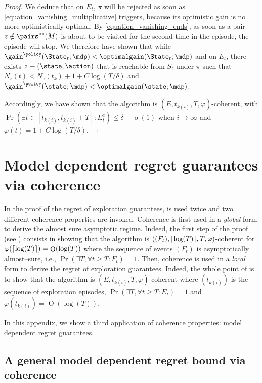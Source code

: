\documentclass[preprint,cleveref,12pt]{colt2025}
\DeclarePairedDelimiter{\ceil}{\lceil}{\rceil}	%
\DeclareMathOperator*{\oh}{\mathrm{o}}
\DeclareMathOperator*{\OH}{\mathrm{O}}
\def\model{\mdp}
\def\optgain{\optimalgain} %
\begin{document}
\begin{proof}
        We deduce that on $E_t$, $\pi$ will be rejected as soon as \eqref{equation_vanishing_multiplicative} triggers, because its optimistic gain is no more optimistically optimal.
        By \eqref{equation_vanishing_ends}, as soon as a pair $z \notin \pairs^{**}(M)$ is about to be visited for the second time in the episode, the episode will stop. 
        We therefore have shown that while $\gain^{\policy}(\State_t;\model) < \optgain(\State_t;\model)$ and on $E_t$, there exists $z \equiv (\state, \action)$ that is reachable from $S_t$ under $\pi$ such that $N_z(t) < N_z(t_k) + 1 + C \log(T/\delta)$ and $\gain^\policy(\state; \model) < \optgain(\state; \model)$.

        Accordingly, we have shown that the algorithm is $(E, t_{k(i)}, T, \varphi)$-coherent, with $\Pr(\exists t \in [t_{k(i)}, t_{k(i)}+T] : E_t^c) \le \delta + \oh(1)$ when $i \to \infty$ and $\varphi(t) = 1 + C \log(T/\delta)$. 
    \end{proof}

    \clearpage
    \section{Model dependent regret guarantees via coherence}
    \label{appendix_model_dependent}

    In the proof of the regret of exploration guarantees,  is used twice and two different coherence properties are invoked.
    Coherence is first used in a \emph{global} form to derive the almost sure asymptotic regime.
    Indeed, the first step of the proof (see ) consists in showing that the algorithm is $((F_t), \ceil{\log(T)}, T, \varphi)$-coherent for $\varphi(\ceil{\log(T)}) = \OH(\log(T))$ where the sequence of events $(F_t)$ is asymptotically almost--sure, i.e., $\Pr(\exists T, \forall t \ge T: F_t) = 1$. 
    Then, coherence is used in a \emph{local} form to derive the regret of exploration guarantees. 
    Indeed, the whole point of  is to show that the algorithm is $(E, t_{k(i)}, T, \varphi)$-coherent where $(t_{k(i)})$ is the sequence of exploration episodes, $\Pr(\exists T, \forall t \ge T: E_t) = 1$ and $\varphi(t_{k(i)}) = \OH(\log(T))$. 

    In this appendix, we show a third application of coherence properties: model dependent regret guarantees.

    \subsection{A general model dependent regret bound via coherence}
\end{document}
